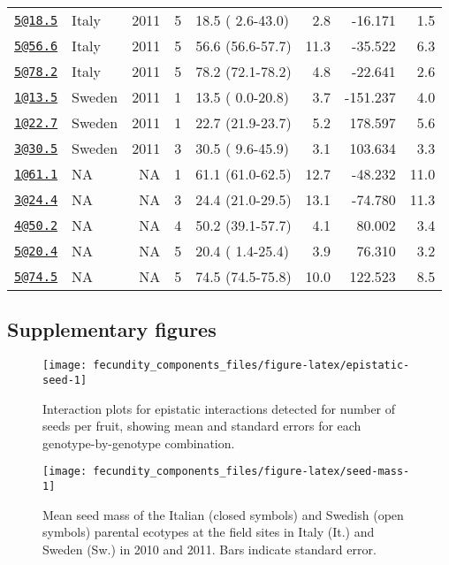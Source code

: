 \documentclass[]{article}
\begin{document}
\begin{longtable}[]{@{}llrrlrrr@{}}
\href{mailto:5@18.5}{\nolinkurl{5@18.5}} & Italy & 2011 & 5 & 18.5 ( 2.6-43.0) & 2.8 & -16.171 & 1.5\tabularnewline
\href{mailto:5@56.6}{\nolinkurl{5@56.6}} & Italy & 2011 & 5 & 56.6 (56.6-57.7) & 11.3 & -35.522 & 6.3\tabularnewline
\href{mailto:5@78.2}{\nolinkurl{5@78.2}} & Italy & 2011 & 5 & 78.2 (72.1-78.2) & 4.8 & -22.641 & 2.6\tabularnewline
\href{mailto:1@13.5}{\nolinkurl{1@13.5}} & Sweden & 2011 & 1 & 13.5 ( 0.0-20.8) & 3.7 & -151.237 & 4.0\tabularnewline
\href{mailto:1@22.7}{\nolinkurl{1@22.7}} & Sweden & 2011 & 1 & 22.7 (21.9-23.7) & 5.2 & 178.597 & 5.6\tabularnewline
\href{mailto:3@30.5}{\nolinkurl{3@30.5}} & Sweden & 2011 & 3 & 30.5 ( 9.6-45.9) & 3.1 & 103.634 & 3.3\tabularnewline
\href{mailto:1@61.1}{\nolinkurl{1@61.1}} & NA & NA & 1 & 61.1 (61.0-62.5) & 12.7 & -48.232 & 11.0\tabularnewline
\href{mailto:3@24.4}{\nolinkurl{3@24.4}} & NA & NA & 3 & 24.4 (21.0-29.5) & 13.1 & -74.780 & 11.3\tabularnewline
\href{mailto:4@50.2}{\nolinkurl{4@50.2}} & NA & NA & 4 & 50.2 (39.1-57.7) & 4.1 & 80.002 & 3.4\tabularnewline
\href{mailto:5@20.4}{\nolinkurl{5@20.4}} & NA & NA & 5 & 20.4 ( 1.4-25.4) & 3.9 & 76.310 & 3.2\tabularnewline
\href{mailto:5@74.5}{\nolinkurl{5@74.5}} & NA & NA & 5 & 74.5 (74.5-75.8) & 10.0 & 122.523 & 8.5\tabularnewline
\bottomrule
\end{longtable}

\newpage

\hypertarget{supplementary-figures}{%
\subsection{Supplementary figures}\label{supplementary-figures}}

\begin{figure}

{\centering \texttt{[image: fecundity\_components\_files/figure-latex/epistatic-seed-1]} 

}

\caption[Epistatic interactions for seeds/fruit]{Interaction plots for epistatic interactions detected for number of seeds per fruit, showing mean and standard errors for each genotype-by-genotype combination.}\label{fig:epistatic-seed}
\end{figure}

\newpage

\begin{figure}

{\centering \texttt{[image: fecundity\_components\_files/figure-latex/seed-mass-1]} 

}

\caption[Seed mass among parental lines]{Mean seed mass of the Italian (closed symbols) and Swedish (open symbols) parental ecotypes at the field sites in Italy (It.) and Sweden (Sw.) in 2010 and 2011. Bars indicate standard error.}\label{fig:seed-mass}
\end{figure}
\end{document}
